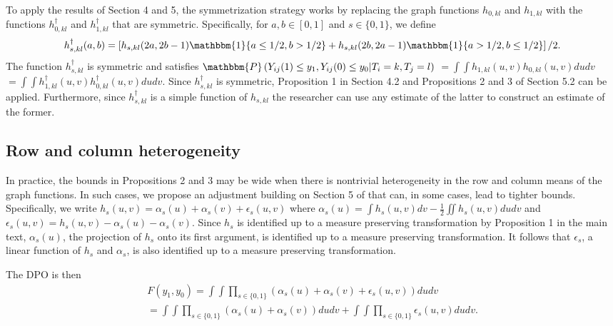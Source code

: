 \documentclass[12pt]{article}
\theoremstyle{definition}
\begin{document}
To apply the results of Section 4 and 5, the symmetrization strategy works by replacing the graph functions $h_{0,kl}$ and $h_{1,kl}$ with the functions $h^{\dagger}_{0,kl}$ and $h^{\dagger}_{1,kl}$ that are symmetric. Specifically, for $a,b \in [0,1]$ and $s \in \{0,1\}$, we define 
\begin{align*}
h^{\dagger}_{s,kl}(a,b) = \left[h_{s,kl}(2a,2b-1)\mathbbm{1}\{a \leq 1/2, b > 1/2\} + h_{s,kl}(2b,2a-1)\mathbbm{1}\{a > 1/2, b \leq 1/2\}\right]/2. 
\end{align*} 
The function $h^{\dagger}_{s,kl}$ is symmetric and satisfies $\mathbbm{P}\left(Y_{ij}(1) \leq y_1, Y_{ij}(0) \leq y_0 | T_i = k, T_j = l\right)$ $= \int\int h_{1,kl}(u,v)h_{0,kl}(u,v)dudv$ $= \int\int h^{\dagger}_{1,kl}(u,v)h^{\dagger}_{0,kl}(u,v)dudv$. Since $h^{\dagger}_{s,kl}$ is symmetric, Proposition 1 in Section 4.2 and Propositions 2 and 3 of Section 5.2 can be applied. Furthermore, since $h^{\dagger}_{s,kl}$ is a simple function of $h_{s,kl}$ the researcher can use any estimate of the latter to construct an estimate of the former. 

\subsection{Row and column heterogeneity}
In practice, the bounds in Propositions 2 and 3 may be wide when there is nontrivial heterogeneity in the  row and column means of the graph functions. In such cases, we propose an adjustment building on Section 5 of  \cite{finke1987quadratic} that can, in some cases, lead to tighter bounds. Specifically, we write $h_{s}(u,v) = \alpha_{s}(u) + \alpha_{s}(v) + \epsilon_{s}(u,v)$ where $\alpha_{s}(u) = \int  h_{s}(u,v) dv - \frac{1}{2}\iint h_{s}(u,v)dudv$ and $\epsilon_{s}(u,v) = h_{s}(u,v) - \alpha_s(u) - \alpha_s(v)$. Since $h_{s}$ is identified up to a measure preserving transformation by Proposition 1 in the main text, $\alpha_s(u)$, the projection of $h_{s}$ onto its first argument, is identified up to a measure preserving transformation. It follows that $\epsilon_s$, a linear function of $h_{s}$ and $\alpha_s$, is also identified up to a measure preserving transformation.      

The DPO is then   
\begin{align*}
F(y_{1},y_{0}) = \int\int \prod_{s \in \{0,1\}}\left(\alpha_{s}(u) + \alpha_{s}(v) + \epsilon_{s}(u,v)\right) dudv \\
= \int\int \prod_{s\in \{0,1\}}\left(\alpha_{s}(u) + \alpha_{s}(v)\right) dudv + \int\int \prod_{s \in \{0,1\}}\epsilon_{s}(u,v)dudv.  
\end{align*}
\end{document}
